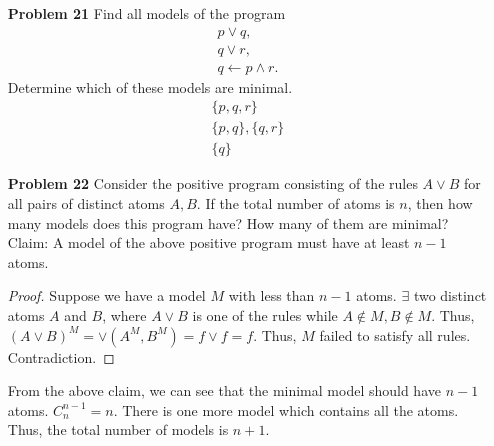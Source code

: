 \begin{enumerate}
\item[\textbf{Problem 21}] Find all models of the program
\begin{gather*}
p\vee q, \\
q \vee r, \\
q \leftarrow p \wedge r. 
\end{gather*}
Determine which of these models are minimal. \\
\begin{gather*}
 \{p, q, r\} \\
 \{p,q\}, \{q, r\} \\
  \{q\}
\end{gather*}




\item[\textbf{Problem 22}] Consider the positive program consisting of the rules $A \vee B$ for all pairs of distinct atoms $A, B$. If the total number of atoms is $n$, then how many models does this program have? How many of them are minimal? \\
Claim: A model of the above positive program must have at least $n - 1$ atoms. 
\begin{proof}
Suppose we have a model $M$ with less than $n - 1$ atoms. $\exists$ two distinct atoms $A$ and $B$, where $A \vee B$ is one of the rules while $A \not \in M, B \not \in M$. Thus, $(A \vee B)^M = \vee (A^M, B^M) = f \vee f = f$. Thus, $M$ failed to satisfy all rules. Contradiction. 
\end{proof}
From the above claim, we can see that the minimal model should have $n - 1$ atoms. $C_{n}^{n - 1} = n$. There is one more model which contains all the atoms. Thus, the total number of models is $n + 1$. 



\end{enumerate}
